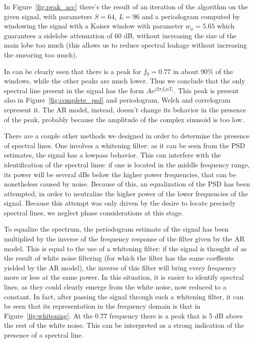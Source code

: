 \documentclass[10pt]{article}
\numberwithin{equation}{section}
\begin{document}
In Figure~\ref{fig:peak_acc} there's the result of an iteration of the algorithm on the given signal, with parameters $S = 64$, $L = 96$ and a periodogram computed by windowing the signal with a Kaiser window with parameter $w_a = 5.65$ which guarantees a sidelobe attenuation of 60 dB, without increasing the size of the main lobe too much (this allows us to reduce spectral leakage without increasing the smearing too much).

In can be clearly seen that there is a peak for $f_0 = 0.77$ in about 90\% of the windows, while the other peaks are much lower. Thus we conclude that the only spectral line present in the signal has the form $A e^{j 2 \pi f_0 n T_c}$. This peak is present also in Figure~\ref{fig:complete_psd} and periodogram, Welch and correlogram represent it. The AR model, instead, doesn't change its behavior in the presence of the peak, probably because the amplitude of the complex sinusoid is too low.

There are a couple other methods we designed in order to determine the presence of spectral lines. One involves a whitening filter: as it can be seen from the PSD estimates, the signal has a lowpass behavior. This can interfere with the identification of the spectral lines: if one is located in the middle frequency range, its power will be several dBs below the higher power frequencies, that can be nonetheless caused by noise. Because of this, an equalization of the PSD has been attempted, in order to neutralize the higher power of the lower frequencies of the signal. Because this attempt was only driven by the desire to locate precisely spectral lines, we neglect phase considerations at this stage.

To equalize the spectrum, the periodogram estimate of the signal has been multiplied by the inverse of the frequency response of the filter given by the AR model. This is equal to the use of a whitening filter: if the signal is thought of as the result of white noise filtering (for which the filter has the same coeffients yielded by the AR model), the inverse of this filter will bring every frequency more or less at the same power. In this situation, it is easier to identify spectral lines, as they could clearly emerge from the white noise, now reduced to a constant. In fact, after passing the signal through such a whitening filter, it can be seen that its representation in the frequency domain is that in Figure~\ref{fig:whitening}. At the $0.77$ frequency there is a peak that is 5 dB above the rest of the white noise. This can be interpreted as a strong indication of the presence of a spectral line.
\end{document}
